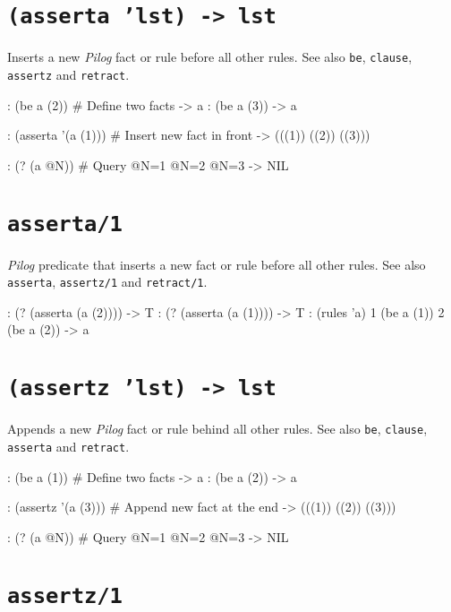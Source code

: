  
\section*{\texttt{(asserta 'lst) -> lst}}
\label{sec:func-ref-A-(asserta 'lst) -> lst}


Inserts a new \emph{Pilog} fact or rule before all other
rules. See also \texttt{be}, \texttt{clause}, \texttt{assertz} and \texttt{retract}.


\begin{wideverbatim}
: (be a (2))            # Define two facts
-> a
: (be a (3))
-> a

: (asserta '(a (1)))    # Insert new fact in front
-> (((1)) ((2)) ((3)))

: (? (a @N))            # Query
 @N=1
 @N=2
 @N=3
-> NIL
\end{wideverbatim}

 
\section*{\texttt{asserta/1}}
\label{sec:func-ref-A-asserta/1}


\emph{Pilog} predicate that inserts a new fact or rule
before all other rules. See also \texttt{asserta}, \texttt{assertz/1} and \texttt{retract/1}.


\begin{wideverbatim}
: (? (asserta (a (2))))
-> T
: (? (asserta (a (1))))
-> T
: (rules 'a)
1 (be a (1))
2 (be a (2))
-> a
\end{wideverbatim}

 
\section*{\texttt{(assertz 'lst) -> lst}}
\label{sec:func-ref-A-(assertz 'lst) -> lst}


Appends a new \emph{Pilog} fact or rule behind all other
rules. See also \texttt{be}, \texttt{clause}, \texttt{asserta} and \texttt{retract}.


\begin{wideverbatim}
: (be a (1))            # Define two facts
-> a
: (be a (2))
-> a

: (assertz '(a (3)))    # Append new fact at the end
-> (((1)) ((2)) ((3)))

: (? (a @N))            # Query
 @N=1
 @N=2
 @N=3
-> NIL
\end{wideverbatim}

 
\section*{\texttt{assertz/1}}
\label{sec:func-ref-A-assertz/1}


